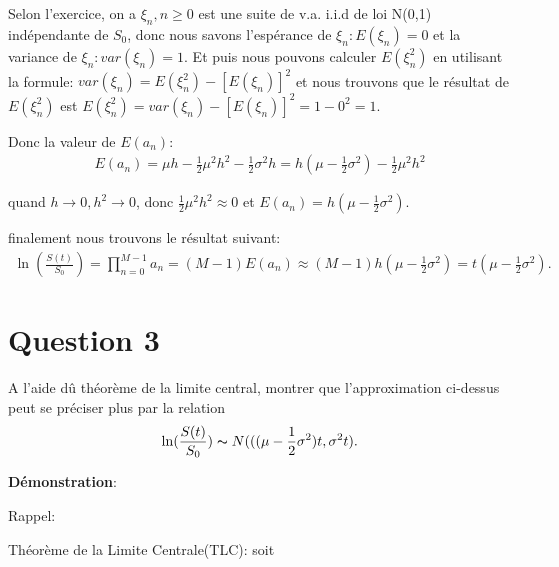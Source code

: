 \documentclass[a4paper,10pt]{report}
\begin{document}
\par Selon l'exercice, on a $\xi_{n}, n \geq 0$ est une suite de v.a. i.i.d de loi N(0,1) indépendante de $S_{0}$, donc nous savons l'espérance de $\xi_{n}: E(\xi_{n}) = 0$ et la variance de $\xi_{n}: var(\xi_{n}) = 1$.  Et puis nous pouvons calculer $E(\xi_{n}^{2})$ en utilisant la formule: $var(\xi_{n}) = E(\xi_{n}^{2}) - [E(\xi_{n})]^{2}$ et nous trouvons que le résultat de $E(\xi_{n}^{2})$ est $E(\xi_{n}^{2}) = var(\xi_{n}) - [E(\xi_{n})]^{2} = 1 - 0^{2} = 1$.
\par Donc la valeur de $E(a_{n})$:
\begin{align*}
	E(a_{n}) = \mu h -\frac{1}{2} \mu^{2} h^{2} -\frac{1}{2} \sigma^{2} h = h(\mu - \frac{1}{2} \sigma^{2}) -\frac{1}{2} \mu^{2} h^{2}
\end{align*}
\par quand $h \rightarrow 0, h^{2} \rightarrow 0$, donc $\frac{1}{2} \mu^{2} h^{2} \approx 0$ et $E(a_{n}) = h(\mu - \frac{1}{2} \sigma^{2})$.
\par finalement nous trouvons le résultat suivant:
\begin{align*}
		\ln (\frac{S(t)}{S_{0}}) = \prod_{n=0}^{M-1} a_{n} = (M-1) E(a_{n}) \approx (M - 1) h(\mu - \frac{1}{2} \sigma^{2}) = t(\mu - \frac{1}{2} \sigma^{2}).
\end{align*}

\section{Question 3}
\par A l'aide dû théorème de la limite central, montrer que l'approximation ci-dessus peut se préciser plus par la relation
\begin{align*}
	\ln (\frac{S(t)}{S_{0}}) \thicksim N(((\mu - \frac{1}{2} \sigma^{2})t, \sigma^{2}t).
\end{align*}

\noindent \textbf{Démonstration}:
\par Rappel:
\par Théorème de la Limite Centrale(TLC): soit 
\end{document}
